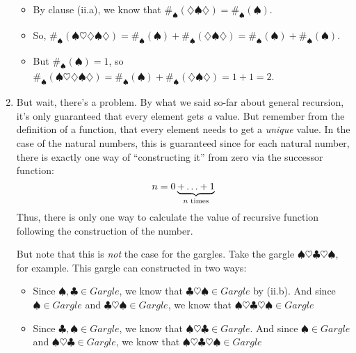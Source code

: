 \begin{enumerate}[{\thesection}.1]
\begin{itemize}
			\item By clause (ii.a), we know that $\#_\spadesuit(\diamondsuit\spadesuit\diamondsuit)=\#_\spadesuit(\spadesuit)$.
			
			\item So, $\#_\spadesuit(\spadesuit\heartsuit\diamondsuit\spadesuit\diamondsuit)=\#_\spadesuit(\spadesuit)+\#_\spadesuit(\diamondsuit\spadesuit\diamondsuit)=\#_\spadesuit(\spadesuit)+\#_\spadesuit(\spadesuit)$.
			
			\item But $\#_\spadesuit(\spadesuit)=1$, so $\#_\spadesuit(\spadesuit\heartsuit\diamondsuit\spadesuit\diamondsuit)=\#_\spadesuit(\spadesuit)+\#_\spadesuit(\diamondsuit\spadesuit\diamondsuit)=1+1=2$.
		
		\end{itemize}
		
		\item But wait, there's a problem. By what we said so-far about general recursion, it's only guaranteed that every element gets \emph{a} value. But remember from the definition of a function, that every element needs to get a \emph{unique} value. In the case of the natural numbers, this is guaranteed since for each natural number, there is exactly one way of ``constructing it'' from zero via the successor function: \[n=0\underbrace{+\mathellipsis+1}_{n\text{ times}}\] Thus, there is only one way to calculate the value of recursive function following the construction of the number.
		
		
		But note that this is \emph{not} the case for the gargles. Take the gargle $\spadesuit\heartsuit\clubsuit\heartsuit\spadesuit$, for example. This gargle can constructed in two ways: 
		\begin{itemize}
		
			\item Since $\spadesuit,\clubsuit\in Gargle$, we know that $\clubsuit\heartsuit\spadesuit\in Gargle$ by (ii.b). And since $\spadesuit\in Gargle$ and $\clubsuit\heartsuit\spadesuit\in Gargle$, we know that $\spadesuit\heartsuit\clubsuit\heartsuit\spadesuit\in Gargle$
		
			\item Since $\clubsuit,\spadesuit\in Gargle$, we know that $\spadesuit\heartsuit\clubsuit\in Gargle$. And since $\spadesuit\in Gargle$ and $\spadesuit\heartsuit\clubsuit\in Gargle$, we know that $\spadesuit\heartsuit\clubsuit\heartsuit\spadesuit\in Gargle$
		
		\end{itemize}
		

\end{enumerate}
